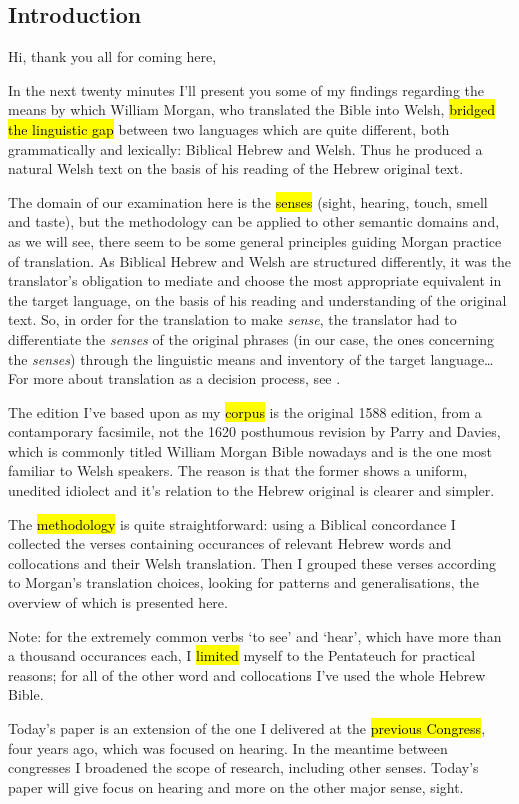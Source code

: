 \begin{paper}
	\section{Introduction}

	{\click} Hi, thank you all for coming here,

	{\click} In the next twenty minutes I’ll present you some of my findings regarding the means by which William Morgan, who translated the Bible into Welsh, \hl{bridged the linguistic gap} between two languages which are quite different, both grammatically and lexically: Biblical Hebrew and Welsh. Thus he produced a natural Welsh text on the basis of his reading of the Hebrew original text.

	The domain of our examination here is the \hl{senses} (sight, hearing, touch, smell and taste), but the methodology can be applied to other semantic domains and, as we will see, there seem to be some general principles guiding Morgan practice of translation. As Biblical Hebrew and Welsh are structured differently, it was the translator’s obligation to mediate and choose the most appropriate equivalent in the target language, on the basis of his reading and understanding of the original text. So, in order for the translation to make \emph{sense}, the translator had to differentiate the \emph{senses} of the original phrases (in our case, the ones concerning the \emph{senses}) through the linguistic means and inventory of the target language… For more about translation as a decision process, see \cite{levy.j:1967:translation}.

	{\click} The edition I’ve based upon as my \hl{corpus} is the original 1588 edition, from a contamporary facsimile, not the 1620 posthumous revision by Parry and Davies, which is commonly titled William Morgan Bible nowadays and is the one most familiar to Welsh speakers. The reason is that the former shows a uniform, unedited idiolect and it’s relation to the Hebrew original is clearer and simpler.

	{\click} The \hl{methodology} is quite straightforward: using a Biblical concordance I collected the verses containing occurances of relevant Hebrew words and collocations and their Welsh translation. Then I grouped these verses according to Morgan’s translation choices, looking for patterns and generalisations, the overview of which is presented here.

	{\click} Note: for the extremely common verbs  ‘to see’ and  ‘hear’, which have more than a thousand occurances each, I \hl{limited} myself to the Pentateuch for practical reasons; for all of the other word and collocations I’ve used the whole Hebrew Bible.

	{\click} Today’s paper is an extension of the one I delivered at the \hl{previous Congress}, four years ago, which was focused on hearing. In the meantime between congresses I broadened the scope of research, including other senses. Today’s paper will give focus on hearing and more on the other major sense, sight.
\end{paper}
